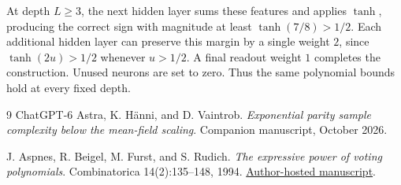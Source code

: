 \documentclass[11pt]{article}
\theoremstyle{remark}\newtheorem{remark}[theorem]{Remark}
\begin{document}
At depth $L\ge3$, the next hidden layer sums these features and
applies $\tanh$, producing the correct sign with magnitude at least
$\tanh(7/8)>1/2$. Each additional hidden layer can preserve this
margin by a single weight $2$, since $\tanh(2u)>1/2$ whenever
$u>1/2$. A final readout weight $1$ completes the construction.
Unused neurons are set to zero. Thus the same polynomial bounds
hold at every fixed depth.

\begin{thebibliography}{9}
ChatGPT-6 Astra, K. H\"anni, and D. Vaintrob.
\emph{Exponential parity sample complexity below the mean-field scaling}.
Companion manuscript, October 2026.

 J. Aspnes, R. Beigel, M. Furst, and S. Rudich.
\emph{The expressive power of voting polynomials}.
Combinatorica 14(2):135--148, 1994.
\href{https://www.cs.yale.edu/homes/aspnes/papers/stoc91voting.pdf}{Author-hosted manuscript}.
\end{thebibliography}
\end{document}
